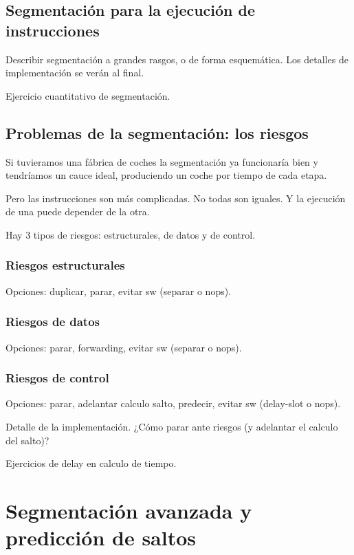 \documentclass[12pt,onecolumn]{memoir}
\begin{document}
\section{Segmentación para la ejecución de instrucciones}

Describir segmentación a grandes rasgos, o de forma esquemática. Los
detalles de implementación se verán al final.

Ejercicio cuantitativo de segmentación.

\section{Problemas de la segmentación: los riesgos}

Si tuvieramos una fábrica de coches la segmentación ya funcionaría
bien y tendríamos un cauce ideal, produciendo un coche por tiempo de
cada etapa.

Pero las instrucciones son más complicadas. No todas son iguales. Y la
ejecución de una puede depender de la otra.

Hay 3 tipos de riesgos: estructurales, de datos y de control. 

\subsection{Riesgos estructurales}

Opciones: duplicar, parar, evitar sw (separar o nops).

\subsection{Riesgos de datos}

Opciones: parar, forwarding, evitar sw (separar o nops).

\subsection{Riesgos de control}

Opciones: parar, adelantar calculo salto, predecir, evitar sw (delay-slot o nops).

Detalle de la implementación. ¿Cómo parar ante riesgos (y adelantar el
calculo del salto)?

Ejercicios de delay en calculo de tiempo.


\chapter{Segmentación avanzada y predicción de saltos}
\label{cap:avanzada}
\end{document}
